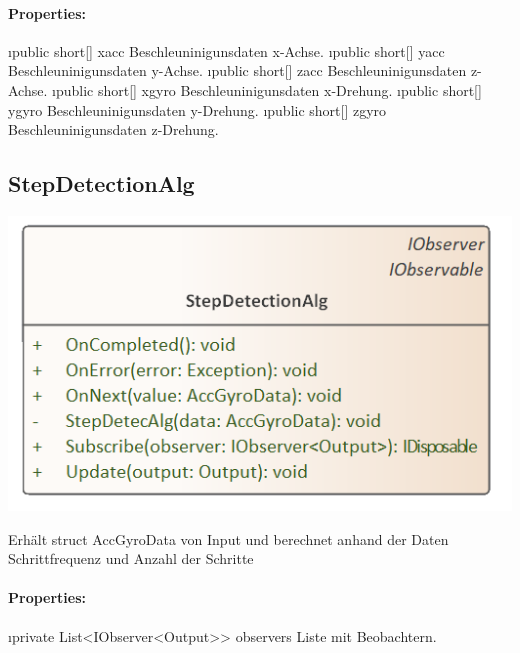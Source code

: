 \documentclass[../entwurf.tex]{subfiles}
\begin{document}
        \paragraph{Properties:}
        \begin{itemize}
            \i{public short[] xacc} Beschleuninigunsdaten x-Achse.
            \i{public short[] yacc} Beschleuninigunsdaten y-Achse.
            \i{public short[] zacc} Beschleuninigunsdaten z-Achse.
            \i{public short[] xgyro} Beschleuninigunsdaten x-Drehung.
            \i{public short[] ygyro} Beschleuninigunsdaten y-Drehung.
            \i{public short[] zgyro} Beschleuninigunsdaten z-Drehung.
        \end{itemize}

    \subsection{StepDetectionAlg}
    	
    	\begin{minipage}{0.75\textwidth}
    		 \includegraphics[scale=0.75]{../uml_klassen/StepDetectionLib/StepDetectionAlg.png}
    	\end{minipage}
    	\begin{minipage}{0.25\textwidth}
    		
        Erhält struct AccGyroData von Input und berechnet anhand der Daten Schrittfrequenz und Anzahl der Schritte
    	\end{minipage}
        \paragraph{Properties:}
        \begin{itemize}
            \i{private List<IObserver<Output>> observers} Liste mit Beobachtern.
        \end{itemize}
    
\end{document}

